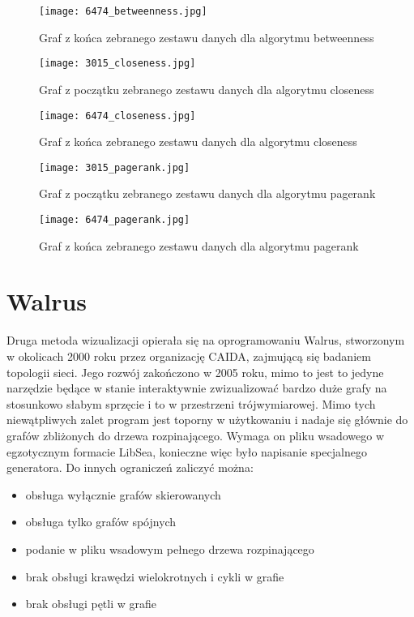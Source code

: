 \FloatBarrier\FloatBarrier
\begin{figure}[h]
	\centering
	\texttt{[image: 6474\_betweenness.jpg]}
	\caption{Graf z końca zebranego zestawu danych dla algorytmu betweenness}
\end{figure}
\FloatBarrier\FloatBarrier

\FloatBarrier\FloatBarrier
\begin{figure}[h]
	\centering
	\texttt{[image: 3015\_closeness.jpg]}
	\caption{Graf z początku zebranego zestawu danych dla algorytmu closeness}
\end{figure}
\FloatBarrier\FloatBarrier

\FloatBarrier\FloatBarrier
\begin{figure}[h]
	\centering
	\texttt{[image: 6474\_closeness.jpg]}
	\caption{Graf z końca zebranego zestawu danych dla algorytmu closeness}
\end{figure}
\FloatBarrier\FloatBarrier

\FloatBarrier\FloatBarrier
\begin{figure}[h]
	\centering
	\texttt{[image: 3015\_pagerank.jpg]}
	\caption{Graf z początku zebranego zestawu danych dla algorytmu pagerank}
\end{figure}
\FloatBarrier\FloatBarrier

\FloatBarrier\FloatBarrier
\begin{figure}[h]
	\centering
	\texttt{[image: 6474\_pagerank.jpg]}
	\caption{Graf z końca zebranego zestawu danych dla algorytmu pagerank}
\end{figure}
\FloatBarrier\FloatBarrier

\section{Walrus}

Druga metoda wizualizacji opierała się na oprogramowaniu Walrus, stworzonym w okolicach 2000 roku przez organizację CAIDA, zajmującą się badaniem topologii sieci. Jego rozwój zakończono w 2005 roku, mimo to jest to jedyne narzędzie będące w stanie interaktywnie zwizualizować bardzo duże grafy na stosunkowo słabym sprzęcie i to w przestrzeni trójwymiarowej. Mimo tych niewątpliwych zalet program jest toporny w użytkowaniu i nadaje się głównie do grafów zbliżonych do drzewa rozpinającego. Wymaga on pliku wsadowego w egzotycznym formacie LibSea, konieczne więc było napisanie specjalnego generatora. 
\newpage 
Do innych ograniczeń zaliczyć można: 
\begin{itemize}
\item obsługa wyłącznie grafów skierowanych
\item obsługa tylko grafów spójnych
\item podanie w pliku wsadowym pełnego drzewa rozpinającego
\item brak obsługi krawędzi wielokrotnych i cykli w grafie
\item brak obsługi pętli w grafie
\end{itemize}

